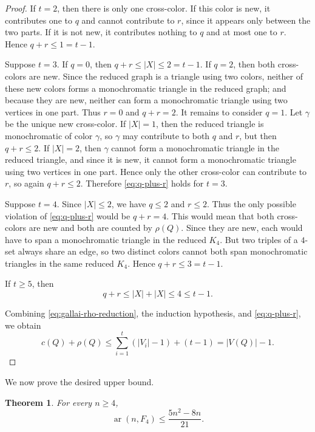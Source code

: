 \documentclass[10pt,a4paper]{article}
\newtheorem{theorem}{Theorem}[section]
\theoremstyle{definition}
\DeclareMathOperator{\ar}{ar}
\begin{document}
\begin{proof}
    If $t=2$, then there is only one cross-color.  If this color is new, it
    contributes one to $q$ and cannot contribute to $r$, since it appears only
    between the two parts.  If it is not new, it contributes nothing to $q$
    and at most one to $r$.  Hence $q+r\le1=t-1$.

    Suppose $t=3$.  If $q=0$, then $q+r\le |X|\le2=t-1$.  If $q=2$, then both
    cross-colors are new.  Since the reduced graph is a triangle using two
    colors, neither of these new colors forms a monochromatic triangle in the
    reduced graph; and because they are new, neither can form a monochromatic
    triangle using two vertices in one part.  Thus $r=0$ and $q+r=2$.
    It remains to consider $q=1$.  Let $\gamma$ be the unique new cross-color.
    If $|X|=1$, then the reduced triangle is monochromatic of color $\gamma$,
    so $\gamma$ may contribute to both $q$ and $r$, but then $q+r\le2$.  If
    $|X|=2$, then $\gamma$ cannot form a monochromatic triangle in the reduced
    triangle, and since it is new, it cannot form a monochromatic triangle
    using two vertices in one part.  Hence only the other cross-color can
    contribute to $r$, so again $q+r\le2$.  Therefore \eqref{eq:q-plus-r}
    holds for $t=3$.

    Suppose $t=4$.  Since $|X|\le2$, we have $q\le2$ and $r\le2$.  Thus the
    only possible violation of \eqref{eq:q-plus-r} would be $q+r=4$.  This
    would mean that both cross-colors are new and both are counted by
    $\rho(Q)$.  Since they are new, each would have to span a monochromatic
    triangle in the reduced $K_4$.  But two triples of a $4$-set always share
    an edge, so two distinct colors cannot both span monochromatic triangles
    in the same reduced $K_4$.  Hence $q+r\le3=t-1$.

    If $t\ge5$, then
    \[
        q+r\le |X|+|X|\le4\le t-1.
    \]

    Combining \eqref{eq:gallai-rho-reduction}, the induction hypothesis, and
    \eqref{eq:q-plus-r}, we obtain
    \[
        c(Q)+\rho(Q)
        \le
        \sum_{i=1}^t(|V_i|-1)+(t-1)
        =
        |V(Q)|-1.
    \]
\end{proof}

We now prove the desired upper bound.

\begin{theorem}\label{thm:asymptotic-all-n}
    For every $n\ge4$,
    \[
        \ar(n,F_4)\le \frac{5n^2-8n}{21}.
    \]
\end{theorem}
\end{document}
